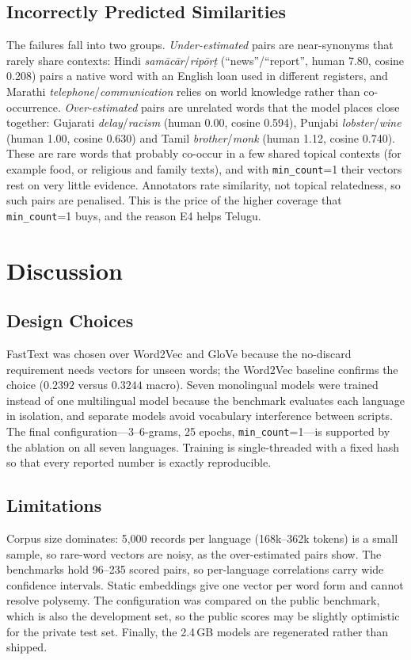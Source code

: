 \documentclass[conference,10pt]{IEEEtran}
\begin{document}
\subsection{Incorrectly Predicted Similarities}
The failures fall into two groups. \textit{Under-estimated} pairs are near-synonyms that rarely share contexts: Hindi \textit{sam\=ac\=ar}/\textit{rip\=or\d{t}} (``news''/``report'', human 7.80, cosine 0.208) pairs a native word with an English loan used in different registers, and Marathi \textit{telephone}/\textit{communication} relies on world knowledge rather than co-occurrence. \textit{Over-estimated} pairs are unrelated words that the model places close together: Gujarati \textit{delay}/\textit{racism} (human 0.00, cosine 0.594), Punjabi \textit{lobster}/\textit{wine} (human 1.00, cosine 0.630) and Tamil \textit{brother}/\textit{monk} (human 1.12, cosine 0.740). These are rare words that probably co-occur in a few shared topical contexts (for example food, or religious and family texts), and with \texttt{min\_count}=1 their vectors rest on very little evidence. Annotators rate similarity, not topical relatedness, so such pairs are penalised. This is the price of the higher coverage that \texttt{min\_count}=1 buys, and the reason E4 helps Telugu.

\section{Discussion}\label{sec:discussion}
\subsection{Design Choices}
FastText was chosen over Word2Vec and GloVe because the no-discard requirement needs vectors for unseen words; the Word2Vec baseline confirms the choice ($0.2392$ versus $0.3244$ macro). Seven monolingual models were trained instead of one multilingual model because the benchmark evaluates each language in isolation, and separate models avoid vocabulary interference between scripts. The final configuration---3--6-grams, 25 epochs, \texttt{min\_count}=1---is supported by the ablation on all seven languages. Training is single-threaded with a fixed hash so that every reported number is exactly reproducible.

\subsection{Limitations}
Corpus size dominates: 5,000 records per language (168k--362k tokens) is a small sample, so rare-word vectors are noisy, as the over-estimated pairs show. The benchmarks hold 96--235 scored pairs, so per-language correlations carry wide confidence intervals. Static embeddings give one vector per word form and cannot resolve polysemy. The configuration was compared on the public benchmark, which is also the development set, so the public scores may be slightly optimistic for the private test set. Finally, the 2.4\,GB models are regenerated rather than shipped.
\end{document}
